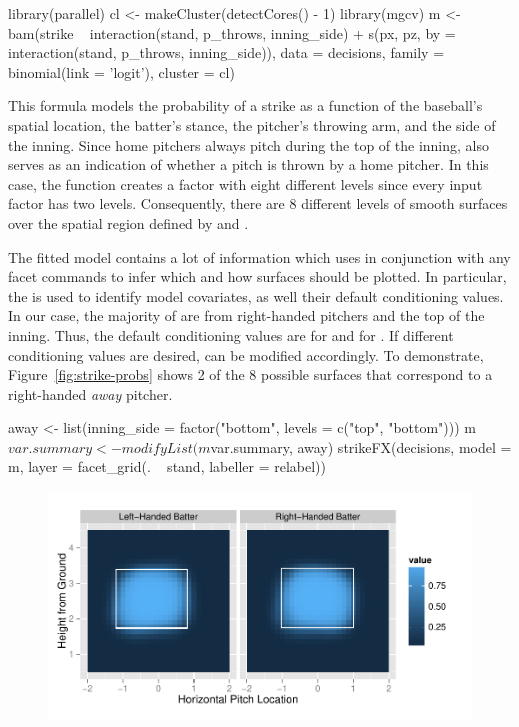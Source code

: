 \documentclass[a4paper]{report}\usepackage[]{graphicx}\usepackage[]{color}
\begin{document}
\begin{article}
\begin{Schunk}
\begin{Sinput}
library(parallel) 
cl <- makeCluster(detectCores() - 1)
library(mgcv) 
m <- bam(strike ~ interaction(stand, p_throws, inning_side) +                
  s(px, pz, by = interaction(stand, p_throws, inning_side)),              
  data = decisions, family = binomial(link = 'logit'), cluster = cl)
\end{Sinput}
\end{Schunk}


This formula models the probability of a strike as a function of the
baseball's spatial location, the batter's stance, the pitcher's throwing
arm, and the side of the inning. Since home pitchers always pitch
during the top of the inning,  also serves as
an indication of whether a pitch is thrown by a home pitcher. In this
case, the  function creates a factor with eight
different levels since every input factor has two levels. Consequently,
there are 8 different levels of smooth surfaces over the spatial region
defined by  and .

The fitted model  contains a lot of information which 
uses in conjunction with any  facet commands to infer
which and how surfaces should be plotted. In particular, the 
is used to identify model covariates, as well their default conditioning
values. In our case, the majority of  are from right-handed
pitchers and the top of the inning. Thus, the default conditioning
values are  for  and 
for . If different conditioning values are desired,
 can be modified accordingly. To demonstrate, Figure~\ref{fig:strike-probs}
shows 2 of the 8 possible surfaces that correspond to a right-handed
\emph{away} pitcher.

\begin{Schunk}
\begin{Sinput}
away <- list(inning_side = factor("bottom", levels = c("top", "bottom")))
m$var.summary <- modifyList(m$var.summary, away)
strikeFX(decisions, model = m, layer = facet_grid(. ~ stand, labeller = relabel))
\end{Sinput}
\end{Schunk}


\begin{figure}[h]
\centerline{\includegraphics[scale = 1]{prob-strike.pdf}}


\end{figure}
\end{article}
\end{document}
